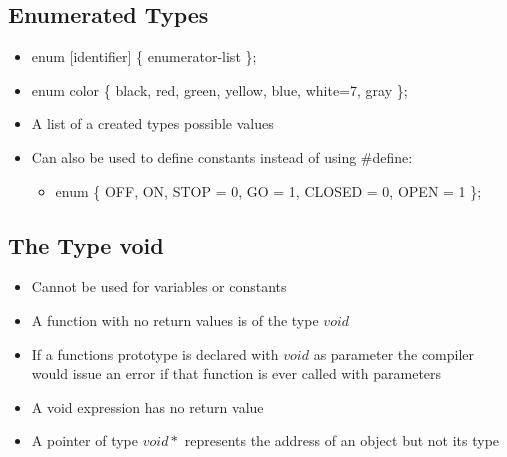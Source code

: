 \documentclass[a4wide,10pt]{article}
\begin{document}
		\subsection{Enumerated Types} %
		\label{sub:enumerated_types}
			\begin{itemize}
				\item enum [identifier] \{ enumerator-list \};
				\item enum color \{ black, red, green, yellow, blue, white=7, gray \};
				\item A list of a created types possible values
				\item Can also be used to define constants instead of using \#define:
					\begin{itemize}
						\item enum \{ OFF, ON, STOP = 0, GO = 1, CLOSED = 0, OPEN = 1 \};
					\end{itemize}
			\end{itemize}
		
		\subsection{The Type void} %
		\label{sub:the_type_void}
			\begin{itemize}
				\item Cannot be used for variables or constants
				\item A function with no return values is of the type $void$
				\item If a functions prototype is declared with $void$ as parameter the compiler would issue an error if that function is ever called with parameters
				\item A void expression has no return value
				\item A pointer of type $void *$ represents the address of an object but not its type
			\end{itemize}
\end{document}
